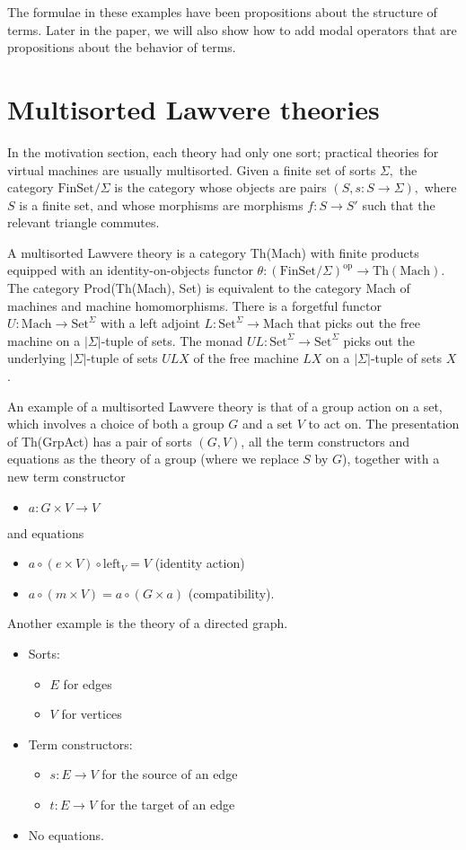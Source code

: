 \documentclass{article}
\newcommand{\maps}{\colon}
\newcommand{\FinSet}{\mathrm{FinSet}}
\newcommand{\Set}{\mathrm{Set}}
\newcommand{\Mach}{\mathrm{Mach}}
\newcommand{\op}{\mathrm{op}}
\begin{document}
The formulae in these examples have been propositions about the structure of terms.  Later in the paper, we will also show how to add modal operators that are propositions about the behavior of terms.

\section{Multisorted Lawvere theories}
In the motivation section, each theory had only one sort; practical theories for virtual machines are usually multisorted.  Given a finite set of sorts $\Sigma,$ the category $\FinSet/\Sigma$ is the category whose objects are pairs $(S, s\maps S\to \Sigma),$ where $S$ is a finite set, and whose morphisms are morphisms $f\maps S \to S'$ such that the relevant triangle commutes.

A multisorted Lawvere theory is a category Th(Mach) with finite products equipped with an identity-on-objects functor ${\theta\maps (\FinSet/\Sigma)^\op \to \mathrm{Th(Mach)}.}$  The category Prod(Th(Mach), Set) is equivalent to the category Mach of machines and machine homomorphisms.  There is a forgetful functor ${U\maps \Mach \to \Set^\Sigma}$ with a left adjoint ${L\maps \Set^\Sigma \to \Mach}$ that picks out the free machine on a $|\Sigma|$-tuple of sets.  The monad ${UL\maps \Set^\Sigma \to \Set^\Sigma}$ picks out the underlying $|\Sigma|$-tuple of sets $ULX$ of the free machine $LX$ on a $|\Sigma|$-tuple of sets $X$.

An example of a multisorted Lawvere theory is that of a group action on a set, which involves a choice of both a group $G$ and a set $V$ to act on.  The presentation of Th(GrpAct) has a pair of sorts $(G, V)$, all the term constructors and equations as the theory of a group (where we replace $S$ by $G$), together with a new term constructor
\begin{itemize}
  \item $a\maps G \times V \to V$
\end{itemize}
and equations
\begin{itemize}
  \item $a \circ (e \times V) \circ \mathrm{left}_V = V$ (identity action)
  \item $a \circ (m \times V) = a \circ (G \times a)$ (compatibility).
\end{itemize}

Another example is the theory of a directed graph.
\begin{itemize}
  \item Sorts:
  \begin{itemize}
    \item $E$ for edges
    \item $V$ for vertices
  \end{itemize}
  \item Term constructors:
  \begin{itemize}
    \item $s\maps E \to V$ for the source of an edge
    \item $t\maps E \to V$ for the target of an edge
  \end{itemize}
  \item No equations.
\end{itemize}
\end{document}
